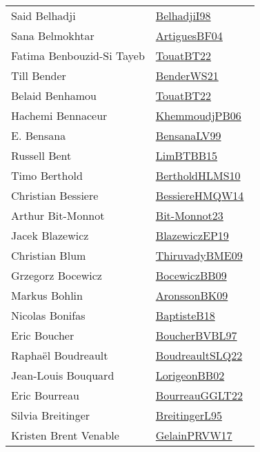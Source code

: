 {\begin{longtable}{p{4cm}p{20cm}}
Said Belhadji & \href{works/BelhadjiI98.pdf}{BelhadjiI98}~\cite{BelhadjiI98}\\
Sana Belmokhtar & \href{works/ArtiguesBF04.pdf}{ArtiguesBF04}~\cite{ArtiguesBF04}\\
Fatima Benbouzid{-}Si Tayeb & \href{works/TouatBT22.pdf}{TouatBT22}~\cite{TouatBT22}\\
Till Bender & \href{works/BenderWS21.pdf}{BenderWS21}~\cite{BenderWS21}\\
Belaid Benhamou & \href{works/TouatBT22.pdf}{TouatBT22}~\cite{TouatBT22}\\
Hachemi Bennaceur & \href{works/KhemmoudjPB06.pdf}{KhemmoudjPB06}~\cite{KhemmoudjPB06}\\
E. Bensana & \href{works/BensanaLV99.pdf}{BensanaLV99}~\cite{BensanaLV99}\\
Russell Bent & \href{works/LimBTBB15.pdf}{LimBTBB15}~\cite{LimBTBB15}\\
Timo Berthold & \href{works/BertholdHLMS10.pdf}{BertholdHLMS10}~\cite{BertholdHLMS10}\\
Christian Bessiere & \href{works/BessiereHMQW14.pdf}{BessiereHMQW14}~\cite{BessiereHMQW14}\\
Arthur Bit{-}Monnot & \href{works/Bit-Monnot23.pdf}{Bit-Monnot23}~\cite{Bit-Monnot23}\\
Jacek Blazewicz & \href{}{BlazewiczEP19}~\cite{BlazewiczEP19}\\
Christian Blum & \href{works/ThiruvadyBME09.pdf}{ThiruvadyBME09}~\cite{ThiruvadyBME09}\\
Grzegorz Bocewicz & \href{works/BocewiczBB09.pdf}{BocewiczBB09}~\cite{BocewiczBB09}\\
Markus Bohlin & \href{works/AronssonBK09.pdf}{AronssonBK09}~\cite{AronssonBK09}\\
Nicolas Bonifas & \href{works/BaptisteB18.pdf}{BaptisteB18}~\cite{BaptisteB18}\\
Eric Boucher & \href{}{BoucherBVBL97}~\cite{BoucherBVBL97}\\
Rapha{\"{e}}l Boudreault & \href{works/BoudreaultSLQ22.pdf}{BoudreaultSLQ22}~\cite{BoudreaultSLQ22}\\
Jean{-}Louis Bouquard & \href{works/LorigeonBB02.pdf}{LorigeonBB02}~\cite{LorigeonBB02}\\
Eric Bourreau & \href{works/BourreauGGLT22.pdf}{BourreauGGLT22}~\cite{BourreauGGLT22}\\
Silvia Breitinger & \href{}{BreitingerL95}~\cite{BreitingerL95}\\
Kristen Brent Venable & \href{works/GelainPRVW17.pdf}{GelainPRVW17}~\cite{GelainPRVW17}\\

\end{longtable}}
